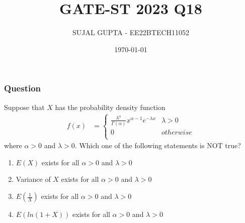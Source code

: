 \documentclass{beamer}
\title{GATE-ST 2023 Q18}
\author{SUJAL GUPTA - EE22BTECH11052}
\institute{EE2102 - IITK (IIT KANDI)}
\date{\today}
\begin{document}
\begin{frame}
\titlepage
\end{frame}
\begin{frame}
\frametitle{Question}
Suppose that $X$ has the probability density function
\begin{align}
f(x)&=
\begin{cases}
\frac{\lambda^{\alpha}}{\Gamma(\alpha)}x^{\alpha - 1} e^{-\lambda x} & \lambda > 0\\
0 & otherwise\\
\end{cases}
\end{align}
where $\alpha > 0$ and $\lambda > 0$. Which one of the following statements is NOT true?
\begin{enumerate}
\item $E(X)$ exists for all $\alpha > 0 $ and $ \lambda > 0$
\item Variance of $X$ exists for all $\alpha > 0$ and $\lambda > 0$
\item $E(\frac{1}{X})$ exists for all $\alpha > 0$ and $\lambda > 0$
\item $E(ln(1+X))$ exists for all $\alpha > 0$ and $\lambda > 0$
\end{enumerate}
\end{frame}
\end{document}
